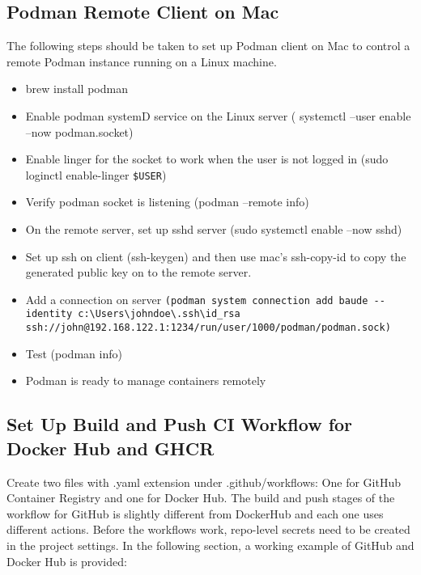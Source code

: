 \documentclass{article}
\begin{document}
\subsection{Podman Remote Client on Mac}
The following steps should be taken to set up Podman client on Mac to control a remote Podman instance running on a Linux machine. 
\begin{itemize}
	\item brew install podman
	\item Enable podman systemD service on the Linux server ( systemctl --user enable --now podman.socket)
	\item Enable linger for the socket to work when the user is not logged in (sudo loginctl enable-linger \lstinline{$USER})
	\item Verify podman socket is listening (podman --remote info)
	\item On the remote server, set up sshd server (sudo systemctl enable --now sshd)
	\item Set up ssh on client (ssh-keygen) and then use mac's ssh-copy-id to copy the generated public key on to the remote server. 
	\item Add a connection on server \lstinline{(podman system connection add baude --identity c:\Users\johndoe\.ssh\id_rsa ssh://john@192.168.122.1:1234/run/user/1000/podman/podman.sock)}
	\item Test (podman info)
	\item Podman is ready to manage containers remotely
\end{itemize}


\subsection{Set Up Build and Push CI Workflow for Docker Hub and GHCR}
Create two files with .yaml extension under .github/workflows: One for GitHub Container Registry and one for Docker Hub. The build and push stages of the workflow for GitHub is slightly different from DockerHub and each one uses different actions. Before the workflows work, repo-level secrets need to be created in the project settings. In the following section, a working example of GitHub and Docker Hub is provided:  
\end{document}

